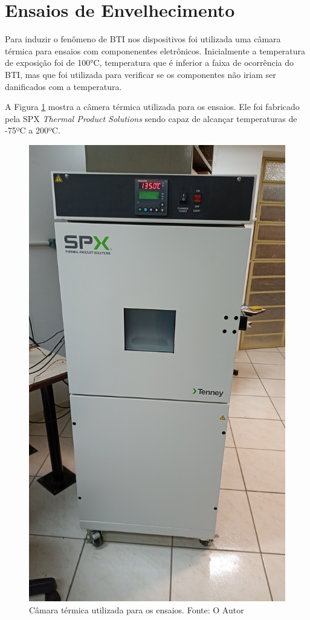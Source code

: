\section{Ensaios de Envelhecimento}
\label{sec:MetEnsaios}

Para induzir o fenômeno de BTI nos dispositivos foi utilizada uma câmara térmica para ensaios com componenentes eletrônicos. Inicialmente a temperatura de exposição foi de 100°C, temperatura que é inferior a faixa de ocorrência do BTI, mas que foi utilizada para verificar se os componentes não iriam ser danificados com a temperatura.

A Figura \ref{fig:CamTerm} mostra a câmera térmica utilizada para os ensaios. Ele foi fabricado pela SPX \textit{Thermal Product Solutions} sendo capaz de alcançar temperaturas de -75ºC a 200ºC.

\begin{figure}[H]
    \centering
    \includegraphics[angle=270, scale=0.08]{figures/Metodologia/Ensaios_CamaraTermica.jpg}
    \caption{Câmara térmica utilizada para os ensaios. Fonte: O Autor}
    \label{fig:CamTerm}
\end{figure}

